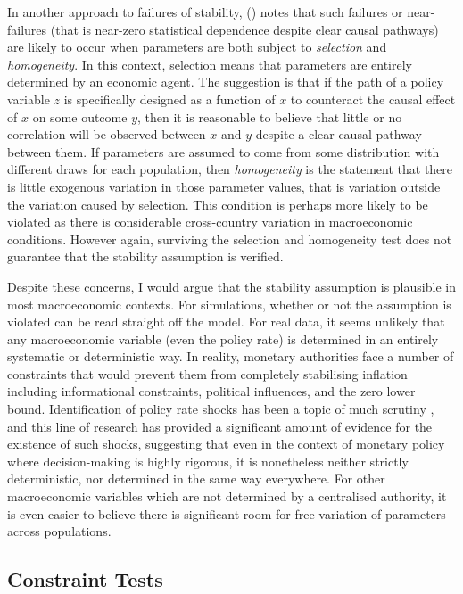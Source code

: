 \documentclass{article}
\begin{document}
In another approach to failures of stability, \citeauthor{steel2006homogeneity} (\citeyear{steel2006homogeneity}) notes that such failures or near-failures (that is near-zero statistical dependence despite clear causal pathways) are likely to occur when parameters are both subject to \textit{selection} and \textit{homogeneity}. In this context, selection means that parameters are entirely determined by an economic agent. The suggestion is that if the path of a policy variable $z$ is specifically designed as a function of $x$ to counteract the causal effect of $x$ on some outcome $y$, then it is reasonable to believe that little or no correlation will be observed between $x$ and $y$ despite a clear causal pathway between them. If parameters are assumed to come from some distribution with different draws for each population, then \textit{homogeneity} is the statement that there is little exogenous variation in those parameter values, that is variation outside the variation caused by selection. This condition is perhaps more likely to be violated as there is considerable cross-country variation in macroeconomic conditions. However again, surviving the selection and homogeneity test does not guarantee that the stability assumption is verified.

Despite these concerns, I would argue that the stability assumption is plausible in most macroeconomic contexts. For simulations, whether or not the assumption is violated can be read straight off the model. For real data, it seems unlikely that any macroeconomic variable (even the policy rate) is determined in an entirely systematic or deterministic way. In reality, monetary authorities face a number of constraints that would prevent them from completely stabilising inflation including informational constraints, political influences, and the zero lower bound. Identification of policy rate shocks has been a topic of much scrutiny \parencite{ramey2016handbook}, and this line of research has provided a significant amount of evidence for the existence of such shocks, suggesting that even in the context of monetary policy where decision-making is highly rigorous, it is nonetheless neither strictly deterministic, nor determined in the same way everywhere. For other macroeconomic variables which are not determined by a centralised authority, it is even easier to believe there is significant room for free variation of parameters across populations.

\subsection{Constraint Tests} \label{constrainttests}
\end{document}

